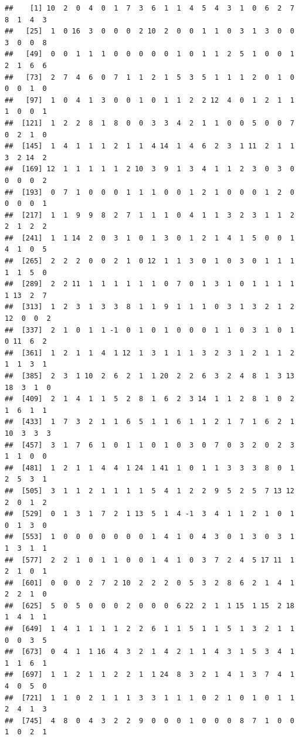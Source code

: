 \documentclass[
]{article}
\begin{document}
\begin{verbatim}
##    [1] 10  2  0  4  0  1  7  3  6  1  1  4  5  4  3  1  0  6  2  7  8  1  4  3
##   [25]  1  0 16  3  0  0  0  2 10  2  0  0  1  1  0  3  1  3  0  0  3  0  0  8
##   [49]  0  0  1  1  1  0  0  0  0  0  1  0  1  1  2  5  1  0  0  1  2  1  6  6
##   [73]  2  7  4  6  0  7  1  1  2  1  5  3  5  1  1  1  2  0  1  0  0  0  1  0
##   [97]  1  0  4  1  3  0  0  1  0  1  1  2  2 12  4  0  1  2  1  1  1  0  0  1
##  [121]  1  2  2  8  1  8  0  0  3  3  4  2  1  1  0  0  5  0  0  7  0  2  1  0
##  [145]  1  4  1  1  1  2  1  1  4 14  1  4  6  2  3  1 11  2  1  1  3  2 14  2
##  [169] 12  1  1  1  1  1  2 10  3  9  1  3  4  1  1  2  3  0  3  0  0  0  0  2
##  [193]  0  7  1  0  0  0  1  1  1  0  0  1  2  1  0  0  0  1  2  0  0  0  0  1
##  [217]  1  1  9  9  8  2  7  1  1  1  0  4  1  1  3  2  3  1  1  2  2  1  2  2
##  [241]  1  1 14  2  0  3  1  0  1  3  0  1  2  1  4  1  5  0  0  1  4  1  0  5
##  [265]  2  2  2  0  0  2  1  0 12  1  1  3  0  1  0  3  0  1  1  1  1  1  5  0
##  [289]  2  2 11  1  1  1  1  1  1  0  7  0  1  3  1  0  1  1  1  1  1 13  2  7
##  [313]  1  2  3  1  3  3  8  1  1  9  1  1  1  0  3  1  3  2  1  2 12  0  0  2
##  [337]  2  1  0  1  1 -1  0  1  0  1  0  0  0  1  1  0  3  1  0  1  0 11  6  2
##  [361]  1  2  1  1  4  1 12  1  3  1  1  1  3  2  3  1  2  1  1  2  1  1  3  1
##  [385]  2  3  1 10  2  6  2  1  1 20  2  2  6  3  2  4  8  1  3 13 18  3  1  0
##  [409]  2  1  4  1  1  5  2  8  1  6  2  3 14  1  1  2  8  1  0  2  1  6  1  1
##  [433]  1  7  3  2  1  1  6  5  1  1  6  1  1  2  1  7  1  6  2  1 10  3  3  3
##  [457]  3  1  7  6  1  0  1  1  0  1  0  3  0  7  0  3  2  0  2  3  1  1  0  0
##  [481]  1  2  1  1  4  4  1 24  1 41  1  0  1  1  3  3  3  8  0  1  2  5  3  1
##  [505]  3  1  1  2  1  1  1  1  5  4  1  2  2  9  5  2  5  7 13 12  2  0  1  2
##  [529]  0  1  3  1  7  2  1 13  5  1  4 -1  3  4  1  1  2  1  0  1  0  1  3  0
##  [553]  1  0  0  0  0  0  0  0  1  4  1  0  4  3  0  1  3  0  3  1  1  3  1  1
##  [577]  2  2  1  0  1  1  0  0  1  4  1  0  3  7  2  4  5 17 11  1  2  1  0  1
##  [601]  0  0  0  2  7  2 10  2  2  2  0  5  3  2  8  6  2  1  4  1  2  2  1  0
##  [625]  5  0  5  0  0  0  2  0  0  0  6 22  2  1  1 15  1 15  2 18  1  4  1  1
##  [649]  1  4  1  1  1  1  2  2  6  1  1  5  1  1  5  1  3  2  1  1  0  0  3  5
##  [673]  0  4  1  1 16  4  3  2  1  4  2  1  1  4  3  1  5  3  4  1  1  1  6  1
##  [697]  1  1  2  1  1  2  2  1  1 24  8  3  2  1  4  1  3  7  4  1  4  0  5  0
##  [721]  1  1  0  2  1  1  1  3  3  1  1  1  0  2  1  0  1  0  1  1  2  4  1  3
##  [745]  4  8  0  4  3  2  2  9  0  0  0  1  0  0  0  8  7  1  0  0  1  0  2  1

\end{verbatim}
\end{document}
